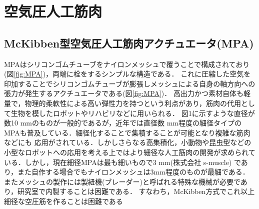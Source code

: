 \newpage
\section{空気圧人工筋肉}
\subsection{McKibben型空気圧人工筋肉アクチュエータ(MPA)}
MPAはシリコンゴムチューブをナイロンメッシュで覆うことで構成されており(図\ref{fig:MPA})，両端に栓をするシンプルな構造である．
これに圧縮した空気を印加することでシリコンゴムチューブが膨張しメッシュによる自身の軸方向への張力が発生するアクチュエータである(図\ref{fig:MPA})\cite{Yu22}．
高出力かつ素材自体も軽量で，物理的柔軟性による高い弾性力を持つという利点があり，筋肉の代用として生物を模したロボットやリハビリなどに用いられる．
図1に示すような直径が数10 mmのものが一般的であるが，近年では直径数 mm程度の細径タイプのMPAも普及している\cite{7989580}．細径化することで集積することが可能となり複雑な筋肉などにも
応用がされている．しかしさらなる高集積化，小動物や昆虫型などの小型なロボットへの応用を考える上ではより細径な人工筋肉の開発が求められている．しかし，現在細径MPAは最も細いもので3 mm(株式会社 s-muscle)
であり，また自作する場合でもナイロンメッシュは3mm程度のものが最細である．またメッシュの製作には製紐機(ブレーダー)と呼ばれる特殊な機械が必要であり，研究室で内製することは困難である．
すなわち，McKibben方式でこれ以上細径な空圧筋を作ることは困難である
